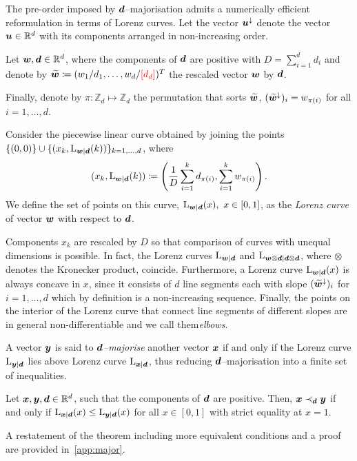 \documentclass[pra,
aps,
twocolumn,
superscriptaddress,
groupedaddress,
nofootinbib,
reprint
]{revtex4-1}
\begin{document}
The pre-order imposed by $\bm{d}$--majorisation admits a numerically efficient reformulation in terms of Lorenz curves.
Let the vector $\bm{u}^\downarrow$ denote the vector $\bm{u} \in \mathbb{R}^d$ with its components arranged in non-increasing order.
\begin{definition}\label{def:lc}
    Let $\bm{w}, \bm{d} \in \mathbb{R}^d$, where the components of $\bm{d}$ are positive with $D = \sum_{i=1}^d d_i$ and denote by $\widetilde{\bm{w}} \coloneqq (w_1/d_1, \dots, w_d/{\color{red}[d_d]})^T$ the rescaled vector $\bm{w}$ by $\bm{d}$.
    
    Finally, denote by $\pi: \mathbb{Z}_d \mapsto \mathbb{Z}_d$ the permutation that sorts $\widetilde{\bm{w}}$, $(\widetilde{\bm{w}}^\downarrow)_i = w_{\pi(i)}$ for all $i=1,\dots,d$.
    
    Consider the piecewise linear curve obtained by joining the points $\{(0,0)\} \cup \{ (x_k, {{\rm{L}}_{\bm{w}|\bm{d}}}(k)) \}_{k=1,\dots,d}$, where
    \begin{equation}\label{eq:lorenz}
        (x_k, {{\rm{L}}_{\bm{w}|\bm{d}}}(k)) \coloneqq \left( \frac{1}{D}\sum_{i=1}^k d_{\pi(i)}, \sum_{i=1}^k w_{\pi(i)} \right).
    \end{equation}
    We define the set of points on this curve, ${{\rm{L}}_{\bm{w}|\bm{d}}}(x),\ x \in [0,1]$, as the \emph{Lorenz curve} of vector $\bm{w}$ with respect to $\bm{d}$.
\end{definition}
Components $x_k$ are rescaled by $D$ so that comparison of curves with unequal dimensions is possible.
In fact, the Lorenz curves ${{\rm{L}}_{\bm{w}|\bm{d}}}$ and ${{\rm{L}}_{\bm{w} \otimes \bm{d}|\bm{d} \otimes \bm{d}}}$, where $\otimes$ denotes the Kronecker product, coincide.
Furthermore, a Lorenz curve ${{\rm{L}}_{\bm{w}|\bm{d}}}(x)$ is always concave in $x$, since it consists of $d$ line segments each with slope $(\widetilde{\bm{w}}^\downarrow)_i$ for $i=1,\dots,d$ which by definition is a non-increasing sequence.
Finally, the points on the interior of the Lorenz curve that connect line segments of different slopes are in general non-differentiable and we call them\emph{elbows}.

A vector $\bm{y}$ is said to \emph{$\bm{d}$--majorise} another vector $\bm{x}$ if and only if the Lorenz curve ${{\rm{L}}_{\bm{y}|\bm{d}}}$ lies above Lorenz curve ${{\rm{L}}_{\bm{x}|\bm{d}}}$, thus reducing $\bm{d}$--majorisation into a finite set of inequalities.
\begin{theorem}\label{thm:dmajor}
    Let $\bm{x}, \bm{y}, \bm{d} \in \mathbb{R}^d$, such that the components of $\bm{d}$ are positive. 
    Then, $\bm{x} \prec_{\bm{d}} \bm{y}$ if and only if ${{\rm{L}}_{\bm{x}|\bm{d}}}(x) \leq {{\rm{L}}_{\bm{y}|\bm{d}}}(x)$ for all $x \in [0,1]$ with strict equality at $x=1$.
\end{theorem}
A restatement of the theorem including more equivalent conditions and a proof are provided in~\cref{app:major}.
	
\end{document}
